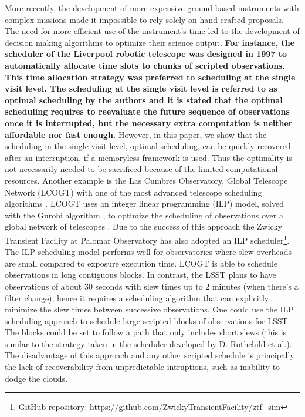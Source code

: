 \documentclass[12pt]{aastex62}
\theoremstyle{definition}
\begin{document}
More recently, the development of more expensive ground-based instruments with complex missions made it impossible to rely solely on hand-crafted proposals. The need for more efficient use of the instrument's time led to the development of decision making algorithms to optimize their science output. {\bf For instance, the scheduler of the Liverpool robotic telescope was designed in 1997 to automatically allocate time slots to chunks of scripted observations. This time allocation strategy was preferred to scheduling at the single visit level. The scheduling at the single visit level is referred to as optimal scheduling by the authors \citep{steele1997control} and it is stated that the optimal scheduling requires to reevaluate the future sequence of observations once it is interrupted, but the necessary extra computation is neither affordable nor fast enough.\bf} However, in this paper, we show that the scheduling in the single visit level, optimal scheduling, can be quickly recovered after an interruption, if a memoryless framework is used. Thus the optimality is not necessarily needed to be sacrificed because of the limited computational resources. Another example is the Las Cumbres Observatory, Global Telescope Network (LCOGT) with one of the most advanced telescope scheduling algorithms \citep{Boroson14, Saunders14}. LCOGT uses an integer linear programming (ILP) model, solved with the Gurobi algorithm \citep{gurobi}, to optimize the scheduling of observations over a global network of telescopes \citep{Lampoudi15}. Due to the success of this approach the Zwicky Transient Facility at Palomar Observatory \citep{Bellm14} has also adopted an ILP scheduler\footnote{GitHub repository: \url{https://github.com/ZwickyTransientFacility/ztf_sim}}. The ILP scheduling model performs well for observatories where slew overheads are small compared to exposure execution time. LCOGT is able to schedule observations in long contiguous blocks. In contrast, the LSST plans to have observations of about 30 seconds with slew times up to 2 minutes (when there's a filter change), hence it requires a scheduling algorithm that can explicitly minimize the slew times between successive observations. One could use the ILP scheduling approach to schedule large scripted blocks of observations for LSST. The blocks could be set to follow a path that only includes short slews (this is similar to the strategy taken in the scheduler developed by D. Rothchild et al.). The disadvantage of this approach and any other scripted schedule is principally the lack of recoverability from unpredictable intruptions, such as inability to dodge the clouds.
\end{document}
